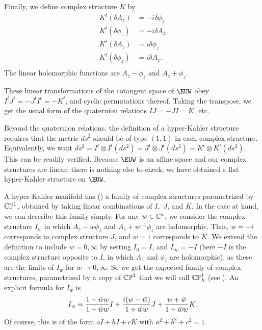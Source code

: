 Finally, we define complex structure $K$ by
\setcounter{equation}{4}
\begin{equation}\label{eq:bluttu}
\begin{aligned}K^t(\delta A_{\bar z} )& = -
i\delta\phi_{\bar z} \\ K^t(\delta \phi_{\bar z}) & = - i\delta
A_{\bar z} \\ K^t(\delta A_{ z} )& =  i\delta\phi_{ z} \\
K^t(\delta \phi_{ z}) & = i\delta A_{ z}. \\\end{aligned}
\end{equation}
 The linear
holomorphic functions are $A_{\bar z}-\phi_{\bar z}$ and
$A_z+\phi_z$.

These linear transformations of the cotangent space of $\EUW$ obey
$I^tJ^t=-J^tI^t=-K^t$, and cyclic permutations thereof. Taking the
transpose, we get the usual form of the quaternion relations
$IJ=-JI=K$, etc.

Beyond the quaternion relations, the definition of a hyper-Kahler
structure requires that the metric $ds^2$ should be of type
$(1,1)$ in each complex structure.  Equivalently, we want
$ds^2=I^t\otimes I^t(ds^2)=J^t\otimes J^t(ds^2)=K^t\otimes
K^t(ds^2).$ This can be readily verified.  Because $\EUW$ is an
affine space and our complex structures are linear, there is
nothing else to check; we have obtained a flat hyper-Kahler
structure on $\EUW.$

A hyper-Kahler manifold has (\xunko) a family of complex
structures parametrized by $\Bbb{CP}^1$, obtained by taking linear
combinations of $I,$ $J$, and $K$.  In the case at hand, we can
describe this family simply.  For any $w\in \Bbb{C}^*$, we
consider the complex structure $I_w$ in which $A_{\bar
z}-w\phi_{\bar z}$ and $A_z+w^{-1}\phi_z$ are holomorphic. Thus,
$w=-i$ corresponds to complex structure $J$, and $w=1$ corresponds
to $K$.  We extend the definition to include $w=0,\infty$ by
setting $I_0=I$, and $I_\infty=-I$ (here $-I$ is the complex
structure opposite to $I$, in which $A_z$ and $\phi_{\bar z}$ are
holomorphic), as these are the limits of $I_w$ for $w\to
0,\infty$. So we get the expected family of complex structures,
parametrized by a copy of $\Bbb{CP}^1$ that we will call
$\Bbb{CP}^1_h$ (see \zunko). An explicit formula for $I_w$ is
\setcounter{equation}{5}
\begin{equation}\label{eq:wyre}
I_w={1-\bar w w\over 1+\bar w w}I+{i(w-\bar w)\over
1+\bar w w}J+{w+\bar w\over 1+\bar w w}K.
\end{equation}
 Of course, this is of
the form $aI+bJ+cK$ with $a^2+b^2+c^2=1$.

